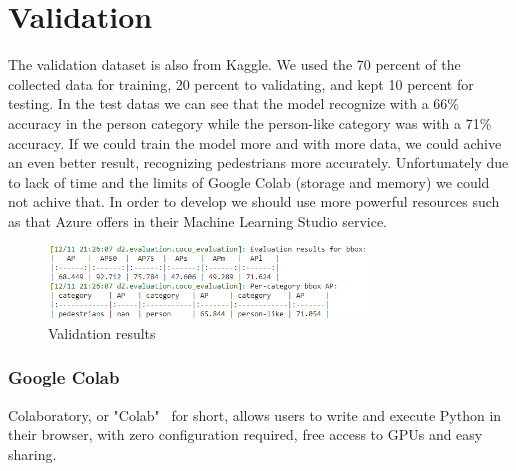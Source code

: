 \section{Validation}
The validation dataset is also from Kaggle. We used the 70 percent of the collected data for training, 20 percent to validating, and kept 10 percent for testing. In the test datas we can see that the model recognize  with a 66\% accuracy in the person category while the person-like category was with a 71\% accuracy. If we could train the model more and with more data, we could achive an even better result, recognizing pedestrians more accurately. Unfortunately due to lack of time and the limits of Google Colab (storage and memory) we could not achive that. In order to develop we should use more powerful resources such as that Azure offers in their Machine Learning Studio service.


\begin{figure}[!ht]
\centering
\includegraphics[width=85mm,keepaspectratio]{fig/validation.png}
\caption{Validation results}
\label{fig:validation} 
\end{figure}

\subsubsection{Google Colab}
Colaboratory, or "Colab"~\cite{colab} for short, allows users to write and execute Python in their browser, with zero configuration required, free access to GPUs and easy sharing.

